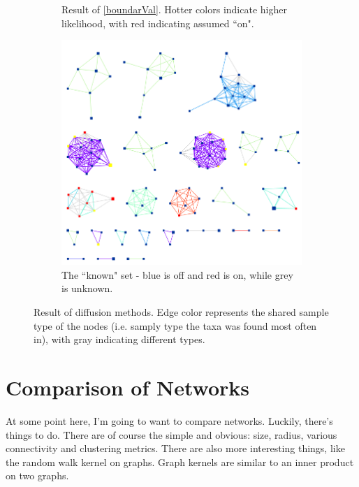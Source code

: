 \documentclass[10pt]{article}
\theoremstyle{definition}
\numberwithin{theorem}{section}
\numberwithin{definition}{section}
\numberwithin{lemma}{section}
\numberwithin{corollary}{section}
\numberwithin{clm}{section}
\numberwithin{rmk}{section}
\begin{document}
\begin{figure}
\begin{center}
\begin{subfigure}[b]{0.48\linewidth}
\begin{center}
	\end{center}
	\caption{Result of \cref{boundarVal}. Hotter colors indicate higher likelihood, with red indicating assumed ``on".}
\end{subfigure}
\begin{subfigure}[b]{0.48\linewidth}
		\begin{center}
		\includegraphics[scale = 0.3]{ranked_known_nodes.png}	
	\end{center}
	\caption{The ``known" set - blue is off and red is on, while grey is unknown.}
\end{subfigure}
\caption{Result of diffusion methods. Edge color represents the shared sample type of the nodes (i.e. samply type the taxa was found most often in), with gray indicating different types.}
\end{center}
\end{figure}	


	
\section{Comparison of Networks}
At some point here, I'm going to want to compare networks. Luckily, there's things to do. There are of course the simple and obvious: size, radius, various connectivity and clustering metrics. There are also more interesting things, like the random walk kernel on graphs. Graph kernels are similar to an inner product on two graphs.
\end{document}
